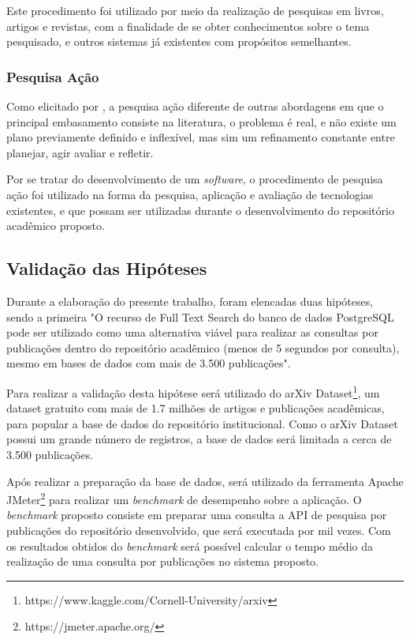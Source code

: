 Este procedimento foi utilizado por meio da realização de pesquisas
em livros, artigos e revistas, com a finalidade de se obter
conhecimentos sobre o tema pesquisado, e outros sistemas
já existentes com propósitos semelhantes.

\subsubsection{Pesquisa Ação}

Como elicitado por \citep[p. 45]{LOVATO:metodologia}, a pesquisa ação
diferente de outras abordagens em que o principal
embasamento consiste na literatura, o problema é real, e não existe
um plano previamente definido e inflexível, mas sim um refinamento
constante entre planejar, agir avaliar e refletir.

Por se tratar do desenvolvimento de um \emph{software}, o procedimento
de pesquisa ação foi utilizado na forma da pesquisa,
aplicação e avaliação de tecnologias existentes, e que possam
ser utilizadas durante o desenvolvimento do repositório
acadêmico proposto.

\subsection{Validação das Hipóteses}

Durante a elaboração do presente trabalho, foram elencadas
duas hipóteses, sendo a primeira "O recurso de Full Text
Search do banco de dados PostgreSQL pode ser utilizado como
uma alternativa viável para realizar as consultas por publicações
dentro do repositório acadêmico (menos de 5 segundos por consulta),
mesmo em bases de dados com mais de 3.500 publicações".

Para realizar a validação desta hipótese será utilizado do
arXiv Dataset\footnote{https://www.kaggle.com/Cornell-University/arxiv},
um dataset gratuito com mais de 1.7 milhões de artigos e publicações acadêmicas,
para popular a base de dados do repositório institucional. Como o arXiv Dataset
possui um grande número de registros, a base de dados será limitada
a cerca de 3.500 publicações.

Após realizar a preparação da base de dados, será utilizado da ferramenta
Apache JMeter\footnote{https://jmeter.apache.org/} para realizar um \emph{benchmark}
de desempenho sobre a aplicação. O \emph{benchmark} proposto consiste em preparar
uma consulta a API de pesquisa por publicações do repositório desenvolvido, que será
executada por mil vezes. Com os resultados obtidos do \emph{benchmark} será possível
calcular o tempo médio da realização de uma consulta por publicações no sistema proposto.

